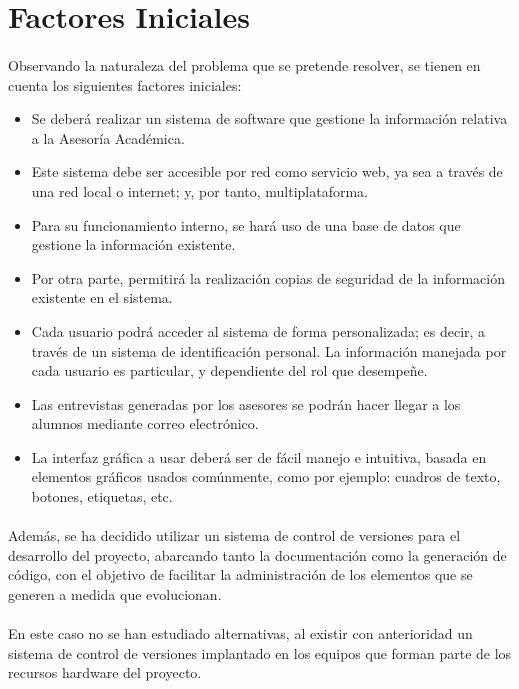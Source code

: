 \section{Factores Iniciales}

\paragraph{}Observando la naturaleza del problema que se pretende resolver, se
tienen en cuenta los siguientes factores iniciales:

\begin{itemize}
   \item Se deberá realizar un sistema de software que gestione la información
   relativa a la Asesoría Académica.
   \item Este sistema debe ser accesible por red como servicio web, ya sea a
   través de una red local o internet; y, por tanto, multiplataforma.
   \item Para su funcionamiento interno, se hará uso de una base de datos que
   gestione la información existente.
   \item Por otra parte, permitirá la realización copias de seguridad de la
   información existente en el sistema.
   \item Cada usuario podrá acceder al sistema de forma personalizada; es decir,
   a través de un sistema de identificación personal. La información manejada
   por cada usuario es particular, y dependiente del rol que desempeñe.
   \item Las entrevistas generadas por los asesores se podrán hacer llegar a los
   alumnos mediante correo electrónico.
   \item La interfaz gráfica a usar deberá ser de fácil manejo e intuitiva,
   basada en elementos gráficos usados comúnmente, como por ejemplo: cuadros de
   texto, botones, etiquetas, etc.
\end{itemize}

\paragraph{}Además, se ha decidido utilizar un sistema de control de versiones
   para el desarrollo del proyecto, abarcando tanto la documentación como la
   generación de código, con el objetivo de facilitar la administración de los
   elementos que se generen a medida que evolucionan.

   \paragraph{}En este caso no se han estudiado alternativas, al existir con
   anterioridad un sistema de control de versiones implantado en los equipos
   que forman parte de los recursos hardware del proyecto.

